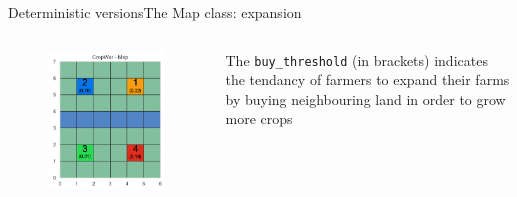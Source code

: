 \documentclass[10pt, aspectratio=169]{beamer}
\def\aa{Deterministic versions}
\def\aab{The Map class: expansion}
\begin{document}
\begin{frame}{\aa}{\aab}
  \begin{columns}
    \centering
    \begin{figure}
      \includegraphics[width=.8\textwidth]{Figures/v12_Map_start.png}
     \end{figure}
     The \texttt{buy\_threshold} (in brackets) indicates the tendancy of farmers to expand their farms by buying neighbouring land in order to grow more crops
  \end{columns}
\end{frame}
\end{document}
